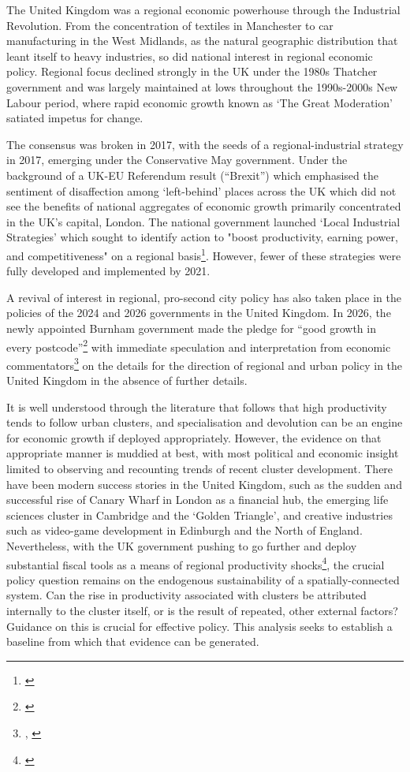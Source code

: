 The United Kingdom was a regional economic powerhouse through the Industrial Revolution.
From the concentration of textiles in Manchester
to car manufacturing in the West Midlands,
as the natural geographic distribution that leant itself to heavy industries,
so did national interest in regional economic policy.
Regional focus declined strongly in the UK under the 1980s Thatcher government
and was largely maintained at lows throughout the 1990s-2000s New Labour period,
where rapid economic growth known as `The Great Moderation' satiated impetus for change.
\par
The consensus was broken in 2017, with the seeds of a regional-industrial strategy in 2017,
emerging under the Conservative May government.
Under the background of a UK-EU Referendum result (``Brexit'')
which emphasised the sentiment of disaffection among `left-behind' places across the UK
which did not see the benefits of national aggregates of economic growth
primarily concentrated in the UK's capital, London.
The national government launched `Local Industrial Strategies' which sought to
identify action to "boost productivity, earning power, and competitiveness" on a regional
basis\footnote{\cite{Mahmood2025}}.
However, fewer of these strategies were fully developed and implemented by 2021.
\par
A revival of interest in regional, pro-second city policy
has also taken place in the policies of the 2024 and 2026 governments in the United Kingdom.
In 2026, the newly appointed Burnham government made the pledge for ``good growth in every
postcode''\footnote{\cite{GOVUK2026}} with immediate speculation and interpretation from
economic commentators\footnote{\cite{Gill2026}, \cite{DeSilva2026}} on the details for
the direction of regional and urban policy in the United Kingdom in the absence of further details.
\par
It is well understood through the literature that follows that high productivity tends to follow urban clusters,
and specialisation and devolution can be an engine for economic growth if deployed appropriately.
However, the evidence on that appropriate manner is muddied at best,
with most political and economic insight limited to observing and recounting trends of recent cluster development.
There have been modern success stories in the United Kingdom, such as the sudden and successful
rise of Canary Wharf in London as a financial hub, the emerging life sciences cluster in Cambridge
and the `Golden Triangle', and creative industries such as video-game development in Edinburgh and the North of England.
Nevertheless, with the UK government pushing to go further and deploy substantial fiscal tools
as a means of regional productivity shocks\footnote{\cite{HMTreasury2026}},
the crucial policy question remains on the endogenous sustainability of a spatially-connected system.
Can the rise in productivity associated with clusters be attributed internally to the cluster itself,
or is the result of repeated, other external factors? Guidance on this is crucial for effective policy.
This analysis seeks to establish a baseline from which that evidence can be generated.